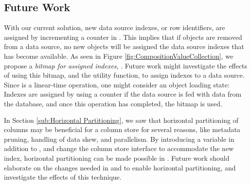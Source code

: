 \subsection{Future Work}
\label{sub:column-store:future-work}
With our current solution, new data source indexes, or row identifiers, are assigned by incrementing a counter in . This implies that if objects are removed from a data source, no new objects will be assigned the data source indexes that has become available. As seen in Figure \ref{fig:CompositionValueCollection}, we propose a \textit{bitmap for assigned indexes}, . Future work might investigate the effects of using this bitmap, and the  utility function, to assign indexes to a data source. Since  is a linear-time operation, one might consider an object loading state: Indexes are assigned by using a counter if the data source is fed with data from the database, and once this operation has completed, the  bitmap is used.

In Section \ref{sub:Horizontal Partitioning}, we saw that horizontal partitioning of columns may be beneficial for a column store for several reasons, like metadata pruning, handling of data skew, and parallelism. By introducing a  variable in addition to , and change the column store interface to accommodate the new index, horizontal partitioning can be made possible in \gap. Future work should elaborate on the changes needed in  and  to enable horizontal partitioning, and investigate the effects of this technique.

